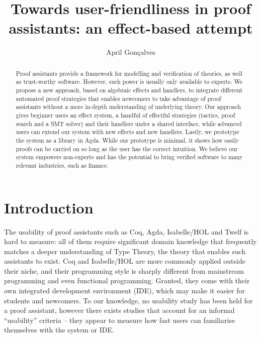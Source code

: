 \documentclass[acmsmall]{acmart}
\begin{document}
\title[Towards user-friendliness in theorem provers]{Towards user-friendliness
  in proof assistants: an effect-based attempt}

\author{April Gonçalves}

\renewcommand{\shortauthors}{April Gonçalves}

\begin{abstract}
Proof assistants provide a framework for modelling and verification of
theories, as well as trust-worthy software. However, such power is usually only
available to experts. We propose a new approach, based on algebraic effects and
handlers, to integrate different automated proof strategies that enables
newcomers to take advantage of proof assistants without a more in-depth
understanding of underlying theory. Our approach gives beginner users an effect
system, a handful of effectful strategies (tactics, proof search and a SMT
solver) and their handlers under a shared interface, while advanced users can
extend our system with new effects and new handlers. Lastly, we prototype the
system as a library in Agda. While our prototype is minimal, it shows how easily
proofs can be carried on so long as the user has the correct intuition. We
believe our system empowers non-experts and has the potential to bring verified
software to many relevant industries, such as finance.
\end{abstract}


\maketitle

\section{Introduction}

The usability of proof assistants such as Coq, Agda, Isabelle/HOL and Twelf is
hard to measure: all of them require significant domain knowledge that
frequently matches a deeper understanding of Type Theory, the theory that
enables such assistants to exist. Coq and Isabelle/HOL are more commonly applied
outside their niche, and their programming style is sharply different from
mainstream programming and even functional programming. Granted, they come with
their own integrated development environment (IDE), which may make it easier for
students and newcomers. To our knowledge, no usability study has been
held for a proof assistant, however there exists studies that account for
an informal ``usability'' criteria -- they appear to measure how fast users can
familiarise themselves with the system or IDE.
\end{document}
